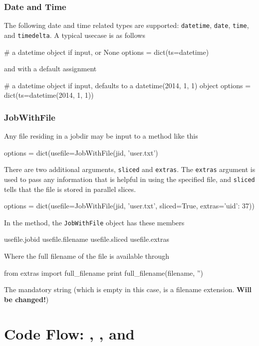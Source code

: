 \subsubsection*{Date and Time}
The following date and time related types are supported:
\texttt{datetime}, \texttt{date}, \texttt{time}, and
\texttt{timedelta}.  A typical usecase is as follows
\begin{python}
  # a datetime object if input, or None
  options = dict(ts=datetime)
\end{python}
and with a default assignment
\begin{python}
  #  a datetime object if input, defaults to a datetime(2014, 1, 1) object
  options = dict(ts=datetime(2014, 1, 1))
\end{python}



\subsubsection*{JobWithFile}
Any file residing in a jobdir may be input to a method like this
\begin{python}
  options = dict(usefile=JobWithFile(jid, 'user.txt')
\end{python}
There are two additional arguments, \texttt{sliced} and
\texttt{extras}.  The \texttt{extras} argument is used to pass any
information that is helpful in using the specified file, and
\texttt{sliced} tells that the file is stored in parallel slices.
\begin{python}
options = dict(usefile=JobWithFile(jid, 'user.txt', sliced=True, extras={'uid': 37}))
\end{python}
In the method, the \texttt{JobWithFile} object has these members
\begin{python}
  usefile.jobid
  usefile.filename
  usefile.sliced
  usefile.extras
\end{python}
Where the full filename of the file is available through
\begin{python}
from extras import full_filename
print full_filename(filename, '')
\end{python}
The mandatory string (which is empty in this case, is a filename
extension.  \textbf{Will be changed!})





\newpage
\section{Code Flow:  \prepare, \analysis, and \synthesis}


